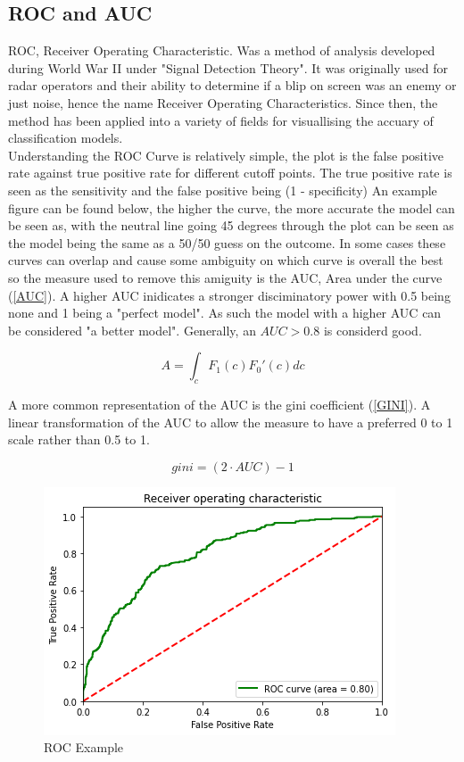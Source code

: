 \subsection{ROC and AUC}
ROC, Receiver Operating Characteristic. Was a method of analysis developed during World War II under "Signal Detection Theory". It was originally used for radar operators and their ability to determine if a blip on screen was an enemy or just noise, hence the name Receiver Operating Characteristics.\cite{tape2000using} Since then, the method has been applied into a variety of fields for visuallising the accuary of classification models. \\

Understanding the ROC Curve is relatively simple, the plot is the false positive rate against true positive rate for different cutoff points. The true positive rate is seen as the sensitivity and the false positive being (1 - specificity) An example figure can be found below, the higher the curve, the more accurate the model can be seen as, with the neutral line going 45 degrees through the plot can be seen as the model being the same as a 50/50 guess on the outcome. In some cases these curves can overlap and cause some ambiguity on which curve is overall the best so the measure used to remove this amiguity is the AUC, Area under the curve (\ref{AUC}). A higher AUC inidicates a stronger disciminatory power with 0.5 being none and 1 being a "perfect model". As such the model with a higher AUC can be considered "a better model". Generally, an $AUC > 0.8$ is considerd good.

\begin{equation}\label{AUC}
A = \int_{c}^{} F_1(c){F_0}'(c) dc
\end{equation}

A more common representation of the AUC is the gini coefficient (\ref{GINI}). A linear transformation of the AUC to allow the measure to have a preferred 0 to 1 scale rather than 0.5 to 1.

\begin{equation}\label{GINI}
gini = (2 \cdot AUC) - 1
\end{equation}

\begin{figure}[!ht]
	\centering
	\includegraphics[scale=1.00]{figs/roc_example.png}
	\caption{ROC Example \label{roc_example}}
\end{figure}

